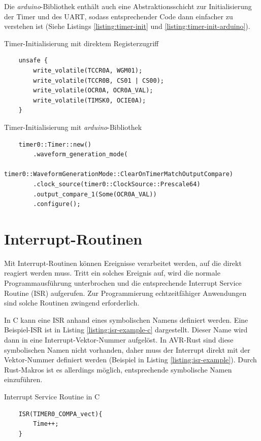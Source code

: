 \documentclass
[ 12pt,
  parskip=half %
]{scrreprt}
\newenvironment{mylisting}[1][H]
{\captionsetup{aboveskip=-0.2\normalbaselineskip}\begin{listing}[#1]}
{\end{listing}}
\begin{document}
Die \textit{arduino}-Bibliothek enthält auch eine Abstraktionsschicht zur Initialisierung der Timer und des UART, sodass entsprechender Code dann einfacher zu verstehen ist (Siehe Listings \ref{listing:timer-init} und \ref{listing:timer-init-arduino}).

\begin{mylisting}
	\caption{Timer-Initialisierung mit direktem Registerzugriff}
	\label{listing:timer-init}
	\begin{verbatim}
	unsafe { 
		write_volatile(TCCR0A, WGM01);
		write_volatile(TCCR0B, CS01 | CS00);
		write_volatile(OCR0A, OCR0A_VAL);
		write_volatile(TIMSK0, OCIE0A);
	}
	\end{verbatim}
\end{mylisting} 

\begin{mylisting}
	\caption{Timer-Initialisierung mit \textit{arduino}-Bibliothek}
	\label{listing:timer-init-arduino}
	\begin{verbatim}
	timer0::Timer::new()
		.waveform_generation_mode(
			timer0::WaveformGenerationMode::ClearOnTimerMatchOutputCompare)
		.clock_source(timer0::ClockSource::Prescale64)
		.output_compare_1(Some(OCR0A_VAL))
		.configure();
	\end{verbatim}
\end{mylisting} 

\section{Interrupt-Routinen}

Mit Interrupt-Routinen können Ereignisse verarbeitet werden, auf die direkt reagiert werden muss. Tritt ein solches Ereignis auf, wird die normale Programmausführung unterbrochen und die entsprechende Interrupt Service Routine (ISR) aufgerufen. Zur Programmierung echtzeitfähiger Anwendungen sind solche Routinen zwingend erforderlich.

In C kann eine ISR anhand eines symbolischen Namens definiert werden. Eine Beispiel-ISR ist in Listing \ref{listing:isr-example-c} dargestellt. Dieser Name wird dann in eine Interrupt-Vektor-Nummer aufgelöst. In AVR-Rust sind diese symbolischen Namen nicht vorhanden, daher muss der Interrupt direkt mit der Vektor-Nummer definiert werden (Beispiel in Listing \ref{listing:isr-example}). Durch Rust-Makros ist es allerdings möglich, entsprechende symbolische Namen einzuführen. 

\begin{mylisting}
	\caption{Interrupt Service Routine in C}
	\label{listing:isr-example-c}
	\begin{verbatim}
	ISR(TIMER0_COMPA_vect){
		Time++;
	}
	\end{verbatim}
\end{mylisting} 
\end{document}

